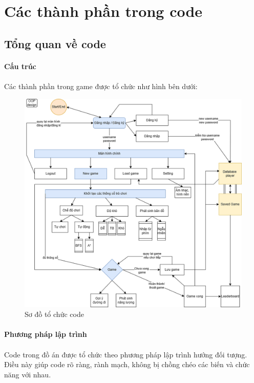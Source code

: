 \newpage
\section{Các thành phần trong code}
\subsection{Tổng quan về code}

\paragraph{Cấu trúc}
\paragraph{}{Các thành phần trong game được tổ chức như hình bên dưới:}
\begin{figure}[H]
    \centering
    \includegraphics[width=1\linewidth]{img/pj_code.png}
    \caption{Sơ đồ tổ chức code}
    \label{fig:pj_code}
\end{figure}
\newpage

\paragraph{Phương pháp lập trình}
\paragraph{}{Code trong đồ án được tổ chức theo phương pháp lập trình hướng đối tượng. Điều này giúp code rõ ràng, rành mạch, không bị chồng chéo các biến và chức năng với nhau.}

